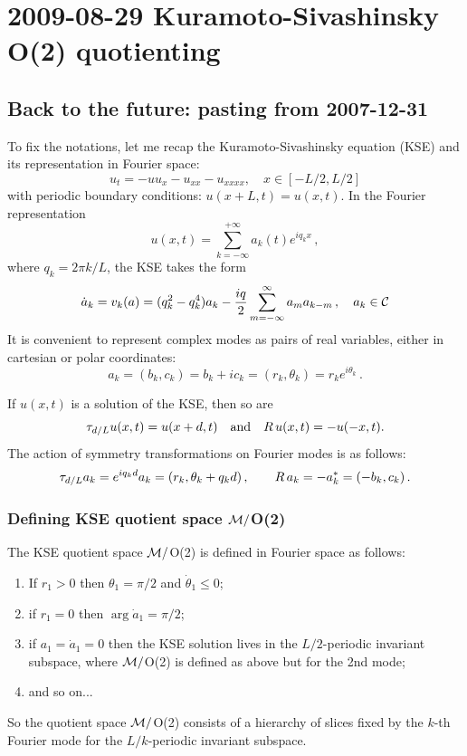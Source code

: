 \section{2009-08-29 Kuramoto-Sivashinsky O(2) quotienting}
\label{2009-08-29KS-O2}

\subsection{Back to the future: pasting from 2007-12-31}

\medskip{}
To fix the notations, let me recap the Kuramoto-Sivashinsky
equation (KSE) and its representation in Fourier space:
\[ u_t = -uu_x - u_{xx} - u_{xxxx},  \quad x \in [-L/2, L/2] \]
with periodic boundary conditions:  $u(x+L,t) = u(x,t)$.  In the Fourier representation
\[ u(x,t)=\sum_{k=-\infty}^{+\infty} a_k (t) e^{ i q_k x }\,,\]
where $ q_k = 2\pi k/L$, the KSE takes the form
\[ \dot{a}_k = v_k(a) = (q_k^2 - q_k^4)a_k - \frac{iq}{2}\sum_{m=-\infty}^{\infty}
    a_m a_{k-m}\,,\quad a_k \in {\cal C}\]
It is convenient to represent complex modes as pairs of real
variables, either in cartesian or polar coordinates:
\[ a_k = (b_k, c_k) = b_k + ic_k = (r_k, \theta_k) = r_k e^{i\theta_k}\,. \]

 If $u(x,t)$ is a solution of the KSE, then so are
\[ \tau_{d/L} u(x,t) = u(x+d,t) \quad\mbox{and}\quad R\,u(x,t) = -u(-x,t).\]
The action of symmetry transformations on Fourier modes is as follows:
\[ \tau_{d/L} a_k = e^{iq_k d} a_k = (r_k, \theta_k + q_k d) \,,\qquad R\,a_k = -a_k^\ast = (-b_k, c_k)\,.\]

\subsubsection{Defining KSE quotient space ${\cal M}/$O(2)} %
\label{sect:RLDslice}

The KSE quotient space ${\cal M}/$O(2) is defined in Fourier space as follows:
\begin{enumerate}
\item If $r_1 > 0$ then $\theta_1 = \pi/2$ and $\dot{\theta}_1 \leq 0$;
\item if $r_1 = 0$ then $\arg \dot{a}_1 = \pi/2$;
\item if $a_1 = \dot{a}_1 = 0$ then the KSE solution lives in
        the $L/2$-periodic invariant subspace, where ${\cal M}/$O(2) is
        defined as above but for the 2nd mode;
\item and so on...
\end{enumerate}
So the quotient space ${\cal M}/$O(2) consists of a hierarchy of
slices fixed by the $k$-th Fourier mode for the
$L/k$-periodic invariant subspace.

